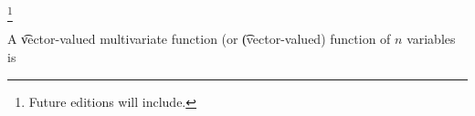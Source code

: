 
\footnote{Future editions will include.}


A \t{vector-valued multivariate function} (or \t{(vector-valued) function of $n$ variables} is

\blankpage
